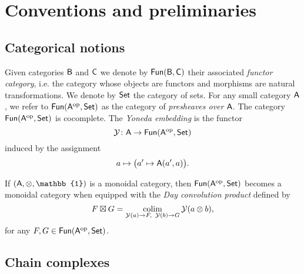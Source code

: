 
\section{Conventions and preliminaries}\label{s:preliminaries}

\subsection{Categorical notions}\label{ss:category theory}
Given categories $\mathsf{B}$ and $\mathsf{C}$ we denote by $\mathsf{Fun}(\mathsf{B}, \mathsf{C})$ their associated \textit{functor category}, i.e. the category whose objects are functors and morphisms are natural transformations. 
We denote by $\mathsf{Set}$ the category of sets.
For any small category $\mathsf{A}$, we refer to $\mathsf{Fun}(\mathsf{A}^{\mathrm{op}}, \mathsf{Set})$ as the category of \textit{presheaves over} $\mathsf{A}$.
The category $\mathsf{Fun}(\mathsf{A}^{\mathrm{op}}, \mathsf{Set})$ is cocomplete.
The \textit{Yoneda embedding} is the functor
\[
\operatorname{\mathcal{Y}} \colon \mathsf{A} \to \mathsf{Fun}(\mathsf{A}^{\mathrm{op}}, \mathsf{Set})
\]
induced by the assignment
\[
a \mapsto \big(a^\prime \mapsto \mathsf{A}(a^\prime, a)\big).
\]

If $(\sA, \otimes, \mathbb{1})$ is a monoidal category, then  $\mathsf{Fun}(\mathsf{A}^{\mathrm{op}}, \mathsf{Set})$ becomes a monoidal category when equipped with the \textit{Day convolution product} defined by
\[ F \boxtimes G = \operatorname*{colim}_{\operatorname{\mathcal{Y}}(a) \to F, \text{ }\operatorname{\mathcal{Y}}(b) \to G} \operatorname{\mathcal{Y}}(a \otimes b),
\]
for any $F,G \in \mathsf{Fun}(\mathsf{A}^{\mathrm{op}}, \mathsf{Set})$.
\subsection{Chain complexes}

